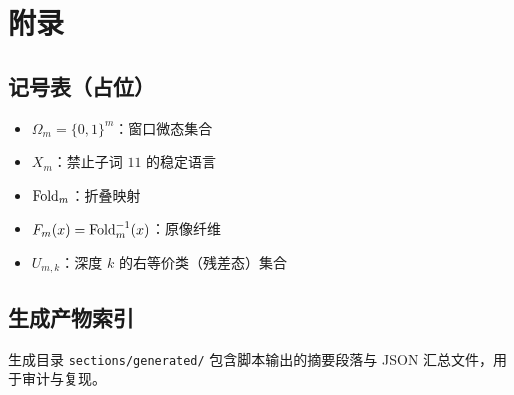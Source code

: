 \section{附录}

\subsection{记号表（占位）}
\begin{itemize}
  \item $\Omega_m=\{0,1\}^m$：窗口微态集合
  \item $X_m$：禁止子词 $11$ 的稳定语言
  \item $\mathrm{Fold}_m$：折叠映射
  \item $F_m(x)=\mathrm{Fold}_m^{-1}(x)$：原像纤维
  \item $U_{m,k}$：深度 $k$ 的右等价类（残差态）集合
\end{itemize}

\subsection{生成产物索引}
生成目录 \verb|sections/generated/| 包含脚本输出的摘要段落与 JSON 汇总文件，用于审计与复现。

